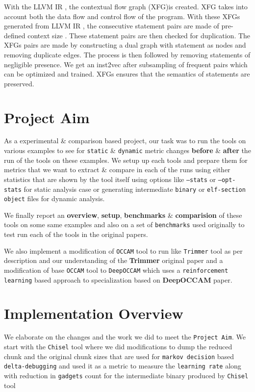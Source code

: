 \documentclass{relatorio}
\begin{document}
With the LLVM IR , the contextual flow graph (XFG)is created. XFG takes into account both the data flow and control flow of the program. With these XFGs generated from LLVM IR , the consecutive statement pairs are made of pre-defined context size . These statement pairs are then  checked for duplication. The XFGs pairs are made by constructing a dual graph with statement as nodes and removing duplicate edges. The process is then followed by removing statements of negligible presence. We get an inst2vec after subsampling of frequent pairs which can be optimized and trained. XFGs ensures that the semantics of statements are preserved.

\section{Project Aim}%
\label{Tools}

As a experimental \& comparison based project, our task was to run the tools on various examples to see for \texttt{static} 
\& \texttt{dynamic} metric changes \textbf{before} \& \textbf{after} the run of the tools on these examples. 
We setup up each tools and prepare them for metrics that we want to extract \& compare in each of the runs using either 
statistics that are shown by the tool itself using options like \texttt{--stats} or \texttt{--opt-stats} for static analysis case 
or generating intermediate \texttt{binary} or \texttt{elf-section object} files for dynamic analysis.

We finally report an \textbf{overview}, \textbf{setup}, \textbf{benchmarks} \& \textbf{comparision} of these tools on some same 
examples and also on a set of \texttt{benchmarks} used originally to test run each of the tools in the original papers. 

We also implement a modification of \texttt{OCCAM} tool to run like \texttt{Trimmer} tool as per description and our understanding 
of the \textbf{Trimmer} original paper and a modification of base \texttt{OCCAM} tool to \texttt{DeepOCCAM} which uses a 
\texttt{reinforcement learning} based approach to specialization based on \textbf{DeepOCCAM} paper. 

\section{Implementation Overview}%
\label{Tools}

We elaborate on the changes and the work we did to meet the \texttt{Project Aim}. We start with the \texttt{Chisel} tool where we did modifications to dump the reduced chunk and the original chunk sizes that are used for \texttt{markov decision} based \texttt{delta-debugging} and used it as a metric to measure the \texttt{learning rate} along with reduction in \texttt{gadgets} count for the intermediate binary produced by \texttt{Chisel} tool
\end{document}
